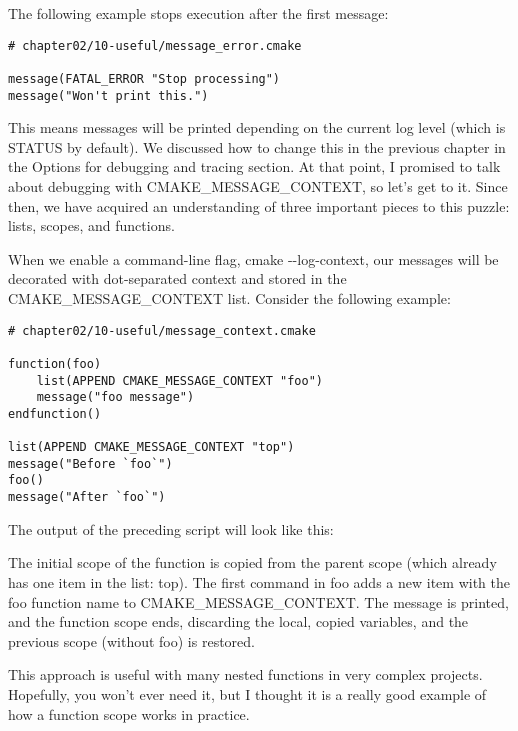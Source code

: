 The following example stops execution after the first message:

\begin{lstlisting}[style=styleCMake]
# chapter02/10-useful/message_error.cmake

message(FATAL_ERROR "Stop processing")
message("Won't print this.")
\end{lstlisting}

This means messages will be printed depending on the current log level (which is STATUS by default). We discussed how to change this in the previous chapter in the Options for debugging and tracing section. At that point, I promised to talk about debugging with CMAKE\_MESSAGE\_CONTEXT, so let's get to it. Since then, we have acquired an understanding of three important pieces to this puzzle: lists, scopes, and functions.

When we enable a command-line flag, cmake -{}-log-context, our messages will be decorated with dot-separated context and stored in the CMAKE\_MESSAGE\_CONTEXT list. Consider the following example:

\begin{lstlisting}[style=styleCMake]
# chapter02/10-useful/message_context.cmake
	
function(foo)
	list(APPEND CMAKE_MESSAGE_CONTEXT "foo")
	message("foo message")
endfunction()

list(APPEND CMAKE_MESSAGE_CONTEXT "top")
message("Before `foo`")
foo()
message("After `foo`")
\end{lstlisting}

The output of the preceding script will look like this:


The initial scope of the function is copied from the parent scope (which already has one item in the list: top). The first command in foo adds a new item with the foo function name to CMAKE\_MESSAGE\_CONTEXT. The message is printed, and the function scope ends, discarding the local, copied variables, and the previous scope (without foo) is restored.

This approach is useful with many nested functions in very complex projects. Hopefully, you won't ever need it, but I thought it is a really good example of how a function scope works in practice.

